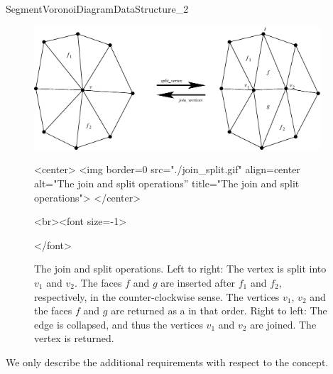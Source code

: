 \begin{ccRefConcept}{SegmentVoronoiDiagramDataStructure_2}
\begin{figure}[htb]%
\begin{ccTexOnly}
\begin{center}
\includegraphics[width=0.95\textwidth]
{Segment_Voronoi_diagram_2_ref/join_split.eps}
\end{center}
\end{ccTexOnly}
\begin{ccHtmlOnly}
<center>
<img border=0 src="./join_split.gif" align=center
alt="The join and split operations''
title="The join and split operations">
</center>
\end{ccHtmlOnly}
\begin{ccHtmlOnly}
<br><font size=-1>
\end{ccHtmlOnly}
\caption{The join and split operations. Left to right:
The vertex  is split into $v_1$ and $v_2$. The faces $f$ and
$g$ are inserted after $f_1$ and $f_2$, respectively, in the
counter-clockwise sense. The vertices $v_1$, $v_2$ and the faces $f$
and $g$ are returned as a  in that order.
Right to left: The edge  is collapsed, and thus the
vertices $v_1$ and $v_2$ are joined. The vertex  is
returned.}
\begin{ccHtmlOnly}
</font>
\end{ccHtmlOnly}
\end{figure}



We only describe the additional requirements with respect to the
 concept.

\ccRefines
{}

%
\ccGlue
{}


\end{ccRefConcept}
